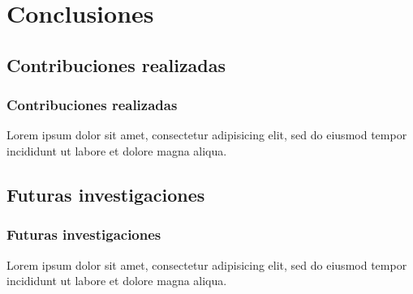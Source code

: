 \section{Conclusiones}

\subsection{Contribuciones realizadas}
\begin{frame}[allowframebreaks]
	\frametitle{Contribuciones realizadas}
	Lorem ipsum dolor sit amet, consectetur adipisicing elit, sed do eiusmod tempor incididunt ut labore et dolore magna aliqua.
\end{frame}

\subsection{Futuras investigaciones}
\begin{frame}[allowframebreaks]
	\frametitle{Futuras investigaciones}
	Lorem ipsum dolor sit amet, consectetur adipisicing elit, sed do eiusmod tempor incididunt ut labore et dolore magna aliqua.
\end{frame}